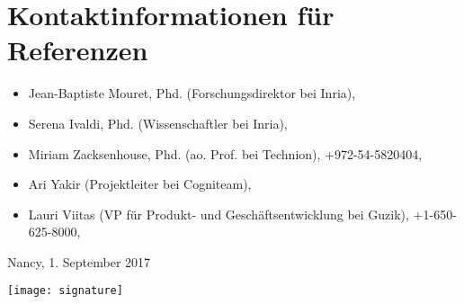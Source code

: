 \documentclass[multipage]{my_resume}
\begin{document}
{	\section*{Kontaktinformationen f{\"u}r Referenzen}
	\begin{itemize}
		\item Jean-Baptiste Mouret, Phd. (Forschungsdirektor bei Inria), 
		\item Serena Ivaldi, Phd. (Wissenschaftler bei Inria), 
		\item Miriam Zacksenhouse, Phd. (ao. Prof. bei Technion), +972-54-5820404, 
		\item Ari Yakir (Projektleiter bei Cogniteam), 
		\item Lauri Viitas (VP f{\"u}r Produkt- und Gesch{\"a}ftsentwicklung bei Guzik), +1-650-625-8000, 
	\end{itemize}
	\vspace{2em}Nancy, 1. September 2017\\
	\begin{flushright}
		\texttt{[image: signature]}\hspace*{3cm}\\
		\vspace{1em}{\Large Jonathan Spitz}
	\end{flushright}
}%
\end{document}
